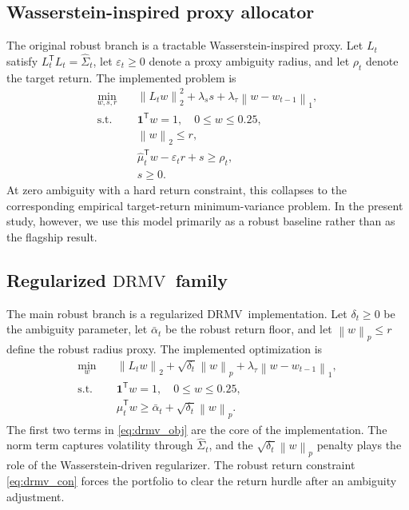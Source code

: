\documentclass[11pt]{article}
\newcommand{\ones}{\mathbf{1}}
\newcommand{\norm}[1]{\left\lVert #1 \right\rVert}
\newcommand{\transpose}{\mathsf{T}}
\newcommand{\DRMV}{\ensuremath{\mathrm{DRMV}}}
\begin{document}
\subsection{Wasserstein-inspired proxy allocator}

The original robust branch is a tractable Wasserstein-inspired proxy. Let $L_t$ satisfy $L_t^\transpose L_t=\widehat\Sigma_t$, let $\varepsilon_t\ge 0$ denote a proxy ambiguity radius, and let $\rho_t$ denote the target return. The implemented problem is
\begin{align}
\min_{w,s,r}\quad & \norm{L_t w}_2^2 + \lambda_s s + \lambda_\tau\norm{w-w_{t-1}}_1, \\
\text{s.t.}\quad & \ones^\transpose w=1, \quad 0\le w\le 0.25, \\
& \norm{w}_2\le r, \\
& \widehat\mu_t^\transpose w - \varepsilon_t r + s \ge \rho_t, \\
& s\ge 0.
\end{align}
At zero ambiguity with a hard return constraint, this collapses to the corresponding empirical target-return minimum-variance problem. In the present study, however, we use this model primarily as a robust baseline rather than as the flagship result.

\subsection{Regularized \DRMV\ family}

The main robust branch is a regularized \DRMV\ implementation. Let $\delta_t\ge 0$ be the ambiguity parameter, let $\bar\alpha_t$ be the robust return floor, and let $\norm{w}_p\le r$ define the robust radius proxy. The implemented optimization is
\begin{align}
\min_w\quad & \norm{L_t w}_2 + \sqrt{\delta_t}\norm{w}_p + \lambda_\tau\norm{w-w_{t-1}}_1,
\label{eq:drmv_obj}
\\
\text{s.t.}\quad & \ones^\transpose w=1, \quad 0\le w\le 0.25,
\\
& \widehat\mu_t^\transpose w \ge \bar\alpha_t + \sqrt{\delta_t}\norm{w}_p.
\label{eq:drmv_con}
\end{align}
The first two terms in \eqref{eq:drmv_obj} are the core of the implementation. The norm term captures volatility through $\widehat\Sigma_t$, and the $\sqrt{\delta_t}\norm{w}_p$ penalty plays the role of the Wasserstein-driven regularizer. The robust return constraint \eqref{eq:drmv_con} forces the portfolio to clear the return hurdle after an ambiguity adjustment.
\end{document}
